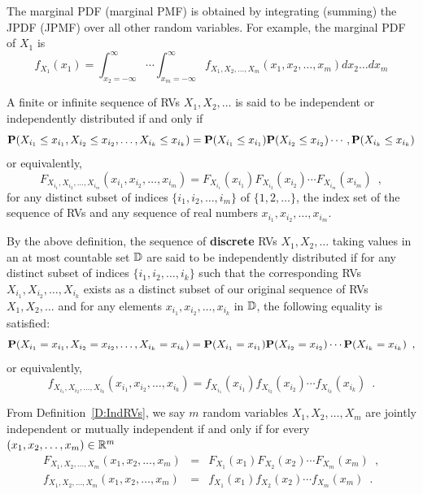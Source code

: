 The marginal PDF (marginal PMF) is obtained by integrating (summing) the JPDF (JPMF) over all other random variables.  
For example, the marginal PDF of $X_1$ is
\[
f_{X_1}(x_1) =
\int_{x_2=-\infty}^{\infty}\cdots \int_{x_m=-\infty}^{\infty} f_{X_1,X_2,\ldots,X_m}(x_1,x_2,\ldots,x_m) dx_2\ldots d x_m 
\]

\begin{definition}\label{D:IndRVs}
A finite or infinite sequence of RVs $X_1,X_2,\ldots$ is said to be independent or independently distributed if and only if
\[
\mathbf{P}(X_{i_1} \leq x_{i_1}, X_{i_2} \leq x_{i_2}, \ldots,  X_{i_k} \leq x_{i_k} ) = \mathbf{P}(X_{i_1} \leq x_{i_1}) \mathbf{P}(X_{i_2} \leq x_{i_2}) \cdots,  \mathbf{P}(X_{i_k} \leq x_{i_k} )
\]
or equivalently,
\[
F_{X_{i_1},X_{i_2},\ldots,X_{i_m}}(x_{i_1},x_{i_2},\ldots,x_{i_m}) = F_{X_{i_1}}(x_{i_1}) F_{X_{i_2}}(x_{i_2}) \cdots F_{X_{i_m}}(x_{i_m}) \enspace ,
\]
for any distinct subset of indices $\{i_1,i_2,\ldots,i_m\}$ of $\{1,2,\ldots\}$, the index set of the sequence of RVs and any sequence of real numbers $x_{i_1},x_{i_2},\ldots,x_{i_m}$.

By the above definition, the sequence of {\bf discrete} RVs $X_1,X_2,\ldots$ taking values in an at most countable set $\mathbb{D}$ are said to be independently distributed if for any distinct subset of indices $\{i_1,i_2,\ldots,i_k\}$ such that the corresponding RVs $X_{i_1},X_{i_2},\ldots,X_{i_k}$ exists as a distinct subset of our original sequence of RVs $X_1,X_2,\ldots$ and for any elements $x_{i_1}, x_{i_2},\ldots,x_{i_k}$ in $\mathbb{D}$, the following equality is satisfied:
\[
\mathbf{P}(X_{i_1}= x_{i_1}, X_{i_2} = x_{i_2}, \ldots,  X_{i_k} = x_{i_k} ) = \mathbf{P}(X_{i_1} = x_{i_1}) \mathbf{P}(X_{i_2} = x_{i_2}) \cdots  \mathbf{P}(X_{i_k} = x_{i_k}) \enspace ,
\]
or equivalently,
\[
f_{X_{i_1}, X_{i_2},\ldots,X_{i_k}} (x_{i_1}, x_{i_2}, \ldots,  x_{i_k} ) = f_{X_{i_1}} (x_{i_1}) f_{X_{i_2}}(x_{i_2}) \cdots  f_{X_{i_k}} (x_{i_k}) \enspace .
\]
\end{definition}

From Definition~\ref{D:IndRVs}, we say $m$ random variables $X_1,X_2,\ldots,X_m$ are jointly independent or mutually independent if and only if for every $(x_1,x_2,\ldots,x_m) \in \mathbb{R}^m$
\begin{eqnarray}
F_{X_{1},X_{2},\ldots,X_{m}}(x_{1},x_{2},\ldots,x_{m}) &=& F_{X_{1}}(x_{1}) F_{X_{2}}(x_{2}) \cdots F_{X_{m}}(x_{m}) \enspace ,\\
f_{X_{1},X_{2},\ldots,X_{m}}(x_{1},x_{2},\ldots,x_{m}) &=& f_{X_{1}}(x_{1}) f_{X_{2}}(x_{2}) \cdots f_{X_{m}}(x_{m}) \enspace .
\end{eqnarray}

